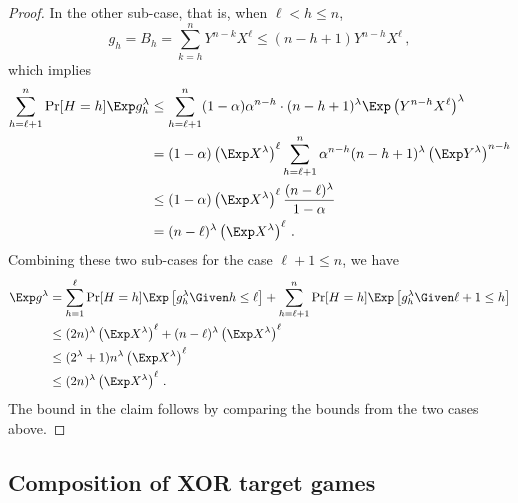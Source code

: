 \begin{proof}
In the other sub-case, that is, when $\ell < h \leq n$, 
\[
    g_h = B_h = \sum_{k = h}^n Y^{n-k} X^\ell \leq (n - h + 1) Y^{n-h} X^\ell \,,
\]
which implies
\begin{align*}
        \sum_{h = \ell + 1}^n \Pr[H = h] \Exp g_h^\lambda 
        &\leq \sum_{h=\ell+1}^n 
            (1-\alpha)\alpha^{n-h}\cdot 
            (n-h+1)^\lambda 
            \Exp\left( Y^{n-h} X^\ell \right)^\lambda \\
        &= (1-\alpha) \left(\Exp X^\lambda\right)^\ell \sum_{h=\ell+1}^n 
            \alpha^{n-h} 
            (n-h+1)^\lambda 
            \left(\Exp Y^\lambda \right)^{n-h} \\
        &\leq (1-\alpha) \left(\Exp X^\lambda\right)^\ell 
            \frac{(n-\ell)^\lambda}{1-\alpha} \\
        &= (n - \ell)^{\lambda} \left(\Exp X^\lambda\right)^\ell 
        \,.
\end{align*}
Combining these two sub-cases for the case $\ell + 1 \leq n$, we have
\begin{align*}
    \Exp g^\lambda 
        &= \sum_{h = 1}^\ell \Pr[H = h] \Exp\left[g_h^\lambda \Given h \leq \ell \right] 
            + \sum_{h = \ell + 1}^n \Pr[H = h] \Exp\left[g_h^\lambda \Given \ell+1 \leq h \right] \\
        &\leq (2n)^\lambda \left(\Exp X^\lambda\right)^\ell +
            (n - \ell)^{\lambda} \left(\Exp X^\lambda\right)^\ell \\
        &\leq (2^{\lambda} + 1) n^\lambda \left(\Exp X^\lambda\right)^\ell \\
        &\leq (2n)^{\lambda} \left(\Exp X^\lambda\right)^\ell
        \,.
\end{align*}
The bound in the claim follows by comparing the bounds from the two cases above. 
\end{proof}



\subsection{Composition of XOR target games}

